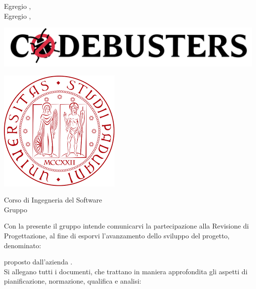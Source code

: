 \documentclass[11pt]{letter}
\begin{document}
    \begin{letter}
        { Egregio \VT{},\\Egregio \CR{},}
        \begin{minipage}{.4\textwidth}
            \begin{flushleft}
                \includegraphics[width=1.5\textwidth]{Utility/Images/logo2.png}
            \end{flushleft}
        \end{minipage}
        \begin{minipage}{.5\textwidth}
            \begin{flushright}
                \includegraphics[width=.4\linewidth]{Utility/Images/logoUnipd.png}
            \end{flushright}
        \end{minipage}
        {    
        \begin{flushleft}
            Corso di Ingegneria del Software\\ Gruppo \Gruppo{}\\ 
        \end{flushleft}
        }
        \opening{ Con la presente il gruppo \Gruppo{} intende comunicarvi la partecipazione alla Revisione di Progettazione, al fine di esporvi l'avanzamento dello sviluppo del progetto, denominato:}
        \begin{center}
           \textbf{\NomeProgetto{}} 
        \end{center}
        proposto dall'azienda \textbf{\Proponente{}}.\\
        Si allegano tutti i documenti, che trattano in maniera approfondita gli aspetti di pianificazione, normazione, qualifica e analisi:
        \begin{itemize}

\end{itemize}
\end{letter}
\end{document}
